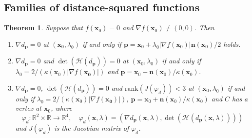 \documentclass[10pt,a4paper]{amsart}
\newtheorem{theorem}{Theorem}[section]
\newcommand{\R}{\mathbb{R}}
\newcommand{\n}{\mathbf{n}}
\newcommand{\x}{\mathbf{x}}
\newcommand{\p}{\mathbf{p}}
\renewcommand{\phi}{\varphi}
\newcommand{\rank}{\mathrm{rank}}
\begin{document}
\subsection{Families of distance-squared functions}


\begin{theorem}
\label{thm:distance}
Suppose that $f(\x_0)=0$ and $\nabla f(\x_0)\ne(0,0)$. Then
\begin{enumerate}
\item
$\nabla d_{\p}=0$ at $(\x_0,\lambda_0)$ if and only if $\p=\x_0+\lambda_0|\nabla f(\x_0)|\n(\x_0)/2$ holds.
\item
$\nabla d_{\p}=0$ and $\det(\mathcal{H}(d_{\p}))=0$ at $(\x_0,\lambda_0)$ if and only if $\lambda_0=2/(\kappa(\x_0)|\nabla f(\bm{x_0})|)$ and $\p=\x_0+\n(\x_0)/\kappa(\x_0)$. 
\item 
$\nabla d_{\p}=0$, $\det(\mathcal{H}(d_{\p}))=0$ and $\rank(J(\phi_d))<3$ at $(\x_0,\lambda_0)$ if and only if $\lambda_0=2/(\kappa(\x_0)|\nabla f(\bm{x_0})|)$, $\p=\x_0+\n(\x_0)/\kappa(\x_0)$ and $C$ has a vertex at $\x_0$, where
\[
\phi_d:\R^2\times\R\to\R^4,\quad \phi_d(\x,\lambda) =(\nabla d_{\p}(\x,\lambda),\det(\mathcal{H}(d_{\p}(\x,\lambda)))) 
\]
and $J(\phi_d)$ is the Jacobian matrix of $\phi_{d}$. 
\end{enumerate}
\end{theorem}
\end{document}
